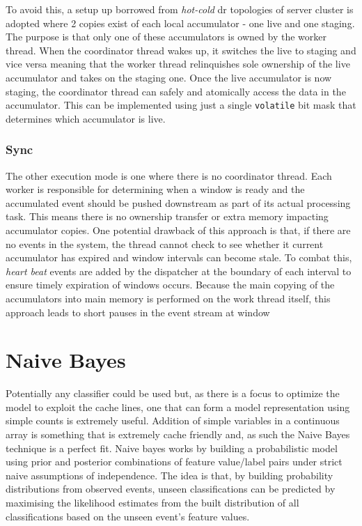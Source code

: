 \documentclass[a4paper,11pt]{scrreprt}
\begin{document}
To avoid this, a setup up borrowed from \textit{hot-cold} \acrshort{dr} topologies of server cluster is adopted where 2 copies exist of each local accumulator - one live and one staging. The purpose is that only one of these accumulators is owned by the worker thread. When the coordinator thread wakes up, it switches the live to staging and vice versa meaning that the worker thread relinquishes sole ownership of the live accumulator and takes on the staging one. Once the live accumulator is now staging, the coordinator thread can safely and atomically access the data in the accumulator. This can be implemented using just a single \texttt{volatile} bit mask that determines which accumulator is live. 
\subsubsection{Sync}
The other execution mode is one where there is no coordinator thread. Each worker is responsible for determining when a window is ready and the accumulated event should be pushed downstream as part of its actual processing task. This means there is no ownership transfer or extra memory impacting accumulator copies. One potential drawback of this approach is that, if there are no events in the system, the thread cannot check to see whether it current accumulator has expired and window intervals can become stale. To combat this, \textit{heart beat} events are added by the dispatcher at the boundary of each interval to ensure timely expiration of windows occurs. Because the main copying of the accumulators into main memory is performed on the work thread itself, this approach leads to short pauses in the event stream at window  
\section{Naive Bayes}
Potentially any classifier could be used but, as there is a focus to optimize the model to exploit the cache lines, one that can form a model representation using simple counts is extremely useful. Addition of simple variables in a continuous array is something that is extremely cache friendly and, as such the Naive Bayes technique is a perfect fit. Naive bayes works by building a probabilistic model using prior and posterior combinations of feature value/label pairs under strict naive assumptions of independence. The idea is that, by building probability distributions from observed events, unseen classifications can be predicted by maximising the likelihood estimates from the built distribution of all classifications based on the unseen event's feature values. 
\end{document}
